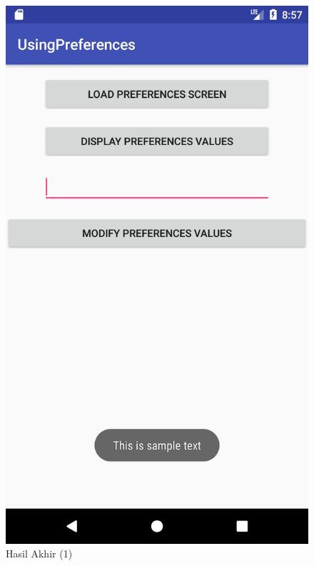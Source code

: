 \documentclass{scrartcl}
\begin{document}
\begin{enumerate}
		\begin{figure}[htbp]
			\begin{minipage}{.5\textwidth}
				\centering
				\includegraphics[width=0.7\linewidth]{Screenshot_1497491875}
				\caption{Hasil Akhir (1)}
				\label{fig:screenshot_1497491875}
			\end{minipage}%
			\begin{minipage}{.5\textwidth}
				\centering

\end{minipage}
\end{figure}
\end{enumerate}
\end{document}
